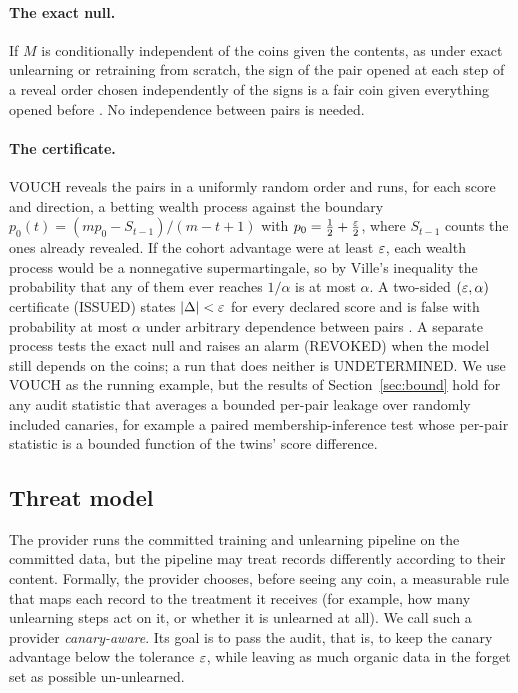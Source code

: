 \paragraph{The exact null.} If $M$ is conditionally independent of the coins given the
contents, as under exact unlearning or retraining from scratch, the sign of the pair opened
at each step of a reveal order chosen independently of the signs is a fair coin given
everything opened before \cite[Thm.~1]{dang2026vouch}. No independence between pairs is
needed.

\paragraph{The certificate.} VOUCH reveals the pairs in a uniformly random order and runs,
for each score and direction, a betting wealth process against the boundary
$p_0(t)=(mp_0-S_{t-1})/(m-t+1)$ with $p_0=\frac12+\frac{\varepsilon}2$, where $S_{t-1}$ counts the
ones already revealed. If the cohort advantage were at least $\varepsilon$, each wealth process
would be a nonnegative supermartingale, so by Ville's inequality the probability that any
of them ever reaches $1/\alpha$ is at most $\alpha$. A two-sided $(\varepsilon,\alpha)$
certificate (ISSUED) states $|\Delta|<\varepsilon$ for every declared score and is false with
probability at most $\alpha$ under arbitrary dependence between pairs
\cite[Thm.~2]{dang2026vouch}. A separate process tests the exact null and raises an alarm
(REVOKED) when the model still depends on the coins; a run that does neither is
UNDETERMINED. We use VOUCH as the running example, but the results of
Section~\ref{sec:bound} hold for any audit statistic that averages a bounded per-pair
leakage over randomly included canaries, for example a paired membership-inference test
whose per-pair statistic is a bounded function of the twins' score difference.

\subsection{Threat model}\label{sec:threat}

The provider runs the committed training and unlearning pipeline on the committed data,
but the pipeline may treat records differently according to their content. Formally, the
provider chooses, before seeing any coin, a measurable rule that maps each record to the
treatment it receives (for example, how many unlearning steps act on it, or whether it
is unlearned at all). We call such a provider \emph{canary-aware}. Its goal is to pass the
audit, that is, to keep the canary advantage below the tolerance $\varepsilon$, while leaving as
much organic data in the forget set as possible un-unlearned.

